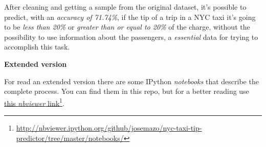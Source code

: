 \normalsize
After cleaning and getting a sample from the original dataset, it's possible to predict, with an \emph{accuracy of 71.74\%}, if the tip of a trip in a NYC taxi it's going to be \emph{less than 20\%} or \emph{greater than or equal to 20\%} of the charge, without the possibility to use information about the passengers, a \emph{essential} data for trying to accomplish this task.

\Large
\textbf{Extended version}

\normalsize
For read an extended version there are some IPython \emph{notebooks} that describe the complete process. You can find them in this repo, but for a better reading use \href{http://nbviewer.ipython.org/github/josemazo/nyc-taxi-tip-predictor/tree/master/notebooks/}{this \emph{nbviewer} link}\footnote{\url{http://nbviewer.ipython.org/github/josemazo/nyc-taxi-tip-predictor/tree/master/notebooks/}}.
